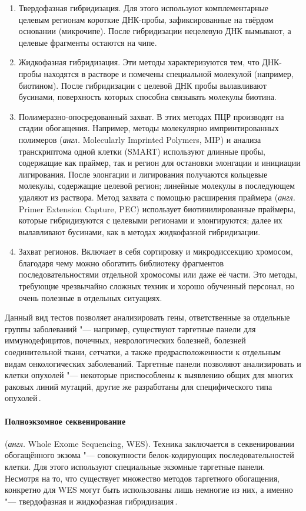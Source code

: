 \documentclass[a4paper,14pt]{extarticle}
\newcommand{\anglia}[1]{\textit{англ.} \textenglish{#1}}
\begin{document}
\begin{enumerate}
\item Твердофазная гибридизация.
Для этого используют комплементарные целевым регионам короткие ДНК-пробы, зафиксированные на твёрдом основании (микрочипе).
После гибридизации нецелевую ДНК вымывают, а целевые фрагменты остаются на чипе.
\item Жидкофазная гибридизация.
Эти методы характеризуются тем, что ДНК-пробы находятся в растворе и помечены специальной молекулой (например, биотином).
После гибридизации с целевой ДНК пробы вылавливают бусинами, поверхность которых способна связывать молекулы биотина.
\item Полимеразно-опосредованный захват.
В этих методах ПЦР производят на стадии обогащения.
Например, методы молекулярно импринтированных полимеров (\anglia{Molecularly Imprinted Polymers, MIP}) и анализа транскриптома одной клетки (SMART) используют длинные пробы, содержащие как праймер, так и регион для остановки элонгации и инициации лигирования.
После элонгации и лигирования получаются кольцевые молекулы, содержащие целевой регион;
линейные молекулы в последующем удаляют из раствора.
Метод захвата с помощью расширения праймера (\anglia{Primer Extension Capture, PEC}) использует биотинилированные праймеры, которые гибридизуются с целевыми регионами и элонгируются;
далее их вылавливают бусинами, как в методах жидкофазной гибридизации.
\item Захват регионов.
Включает в себя сортировку и микродиссекцию хромосом, благодаря чему можно обогатить библиотеку фрагментов последовательностями отдельной хромосомы или даже её части.
Это методы, требующие чрезвычайно сложных техник и хорошо обученный персонал, но очень полезные в отдельных ситуациях.
\end{enumerate}

Данный вид тестов позволяет анализировать гены, ответственные за отдельные группы заболеваний "--- например, существуют таргетные панели для иммунодефицитов, почечных, неврологических болезней, болезней соединительной ткани, сетчатки, а также предрасположенности к отдельным видам онкологических заболеваний.
Таргетные панели позволяют анализировать и клетки опухолей "--- некоторые приспособлены к выявлению общих для многих раковых линий мутаций, другие же разработаны для специфического типа опухолей\,\cite{Yohe_2017}.

\paragraph{Полноэкзомное секвенирование} (\anglia{Whole Exome Sequencing, WES}).
Техника заключается в секвенировании обогащённого экзома "--- совокупности белок-кодирующих последовательностей клетки.
Для этого используют специальные экзомные таргетные панели.
Несмотря на то, что существует множество методов таргетного обогащения, конкретно для WES могут быть использованы лишь немногие из них, а именно "--- твердофазная и жидкофазная гибридизация\,\cite{Teer_2010}.
\end{document}
